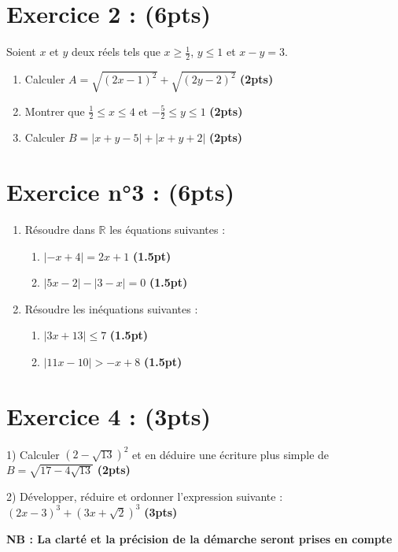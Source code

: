 \documentclass[12pt,a4paper]{article}
\begin{document}
\section*{Exercice 2 : (6pts)}
Soient $x$ et $y$ deux réels tels que $x \geq \frac{1}{2}$, $y \leq 1$ et $x - y = 3$.
\begin{enumerate}
\item Calculer $A = \sqrt{(2x - 1)^2} + \sqrt{(2y - 2)^2}$ \hspace{1cm} \textbf{(2pts)}

\item Montrer que $\frac{1}{2} \leq x \leq 4$ et $-\frac{5}{2} \leq y \leq 1$ \hspace{1cm} \textbf{(2pts)}

\item Calculer $B = |x + y - 5| + |x + y + 2|$ \hspace{1cm} \textbf{(2pts)}
\end{enumerate}
\section*{Exercice n°3 : (6pts)}

\begin{enumerate}
\item Résoudre dans $\mathbb{R}$ les équations suivantes :
    \begin{enumerate}
        \item $| -x + 4 | = 2x + 1$ \hspace{1cm} \textbf{(1.5pt)}
        \item $|5x - 2| - |3 - x| = 0$ \hspace{1cm} \textbf{(1.5pt)}
    \end{enumerate}
\item Résoudre les inéquations suivantes :
    \begin{enumerate}
        \item $|3x + 13| \leq 7$ \hspace{1cm} \textbf{(1.5pt)}
        \item $|11x - 10| > -x + 8$ \hspace{1cm} \textbf{(1.5pt)}
    \end{enumerate}
\end{enumerate}
\section*{Exercice 4 : (3pts)}

1) Calculer $(2 - \sqrt{13})^2$ et en déduire une écriture plus simple de $B = \sqrt{17 - 4\sqrt{13}}$ \hspace{8cm} \textbf{(2pts)}

2) Développer, réduire et ordonner l'expression suivante : $(2x - 3)^3 + (3x + \sqrt{2})^3$ \hspace{1cm} \textbf{(3pts)}\vspace{1cm}

\textbf{NB : La clarté et la précision de la démarche seront prises en compte}
\end{document}
